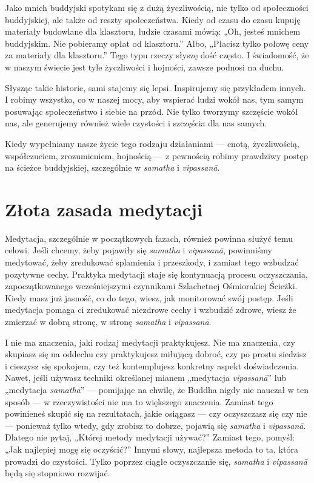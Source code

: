 \documentclass[12pt,openany]{book}
\begin{document}
Jako mnich buddyjski spotykam się z dużą życzliwością, nie tylko od społeczności buddyjskiej, ale także od reszty społeczeństwa. Kiedy od czasu do czasu kupuję materiały budowlane dla klasztoru, ludzie czasami mówią: „Oh, jesteś mnichem buddyjskim. Nie pobieramy opłat od klasztoru.” Albo, „Płacisz tylko połowę ceny za materiały dla klasztoru.” Tego typu rzeczy słyszę dość często. I świadomość, że w naszym świecie jest tyle życzliwości i hojności, zawsze podnosi na duchu. 

Słysząc takie historie, sami stajemy się lepsi. Inspirujemy się przykładem innych. I robimy wszystko, co w naszej mocy, aby wspierać ludzi wokół nas, tym samym posuwając społeczeństwo i siebie na przód. Nie tylko tworzymy szczęście wokół nas, ale generujemy również wiele czystości i szczęścia dla nas samych.

Kiedy wypełniamy nasze życie tego rodzaju działaniami \linebreak --- cnotą, życzliwością, współczuciem, zrozumieniem, hojnością --- z pewnością robimy prawdziwy postęp na ścieżce buddyjskiej, szczególnie w \textit{samatha} i \textit{vipassanā}.

\section*{Złota zasada medytacji}

Medytacja, szczególnie w początkowych fazach, również po\-win\-na służyć temu celowi. Jeśli chcemy, żeby pojawiły się \textit{samatha} i \textit{vipassanā}, powinniśmy medytować, żeby zredukować splamienia i przeszkody, i zamiast tego wzbudzać pozytywne cechy. Praktyka medytacji staje się kontynuacją procesu oczyszczania, zapoczątkowanego wcześniejszymi czynnikami Szlachetnej Ośmiorakiej Ścieżki. Kiedy masz już jasność, co do tego, wiesz, jak monitorować swój postęp. Jeśli medytacja pomaga ci zredukować niezdrowe cechy i wzbudzić zdrowe, wiesz że zmierzać w dobrą stro\-nę, w stronę \textit{samatha} i \textit{vipassanā}.

I nie ma znaczenia, jaki rodzaj medytacji praktykujesz. Nie ma znaczenia, czy skupiasz się na oddechu czy praktykujesz miłującą dobroć, czy po prostu siedzisz i cieszysz się spokojem, czy też kontemplujesz konkretny aspekt doświadczenia. Nawet, jeśli używasz techniki określanej mianem „medytacja \textit{vipassanā}” lub „medytacja \textit{samatha}” --- pomijając na chwilę, że Buddha nigdy nie nauczał w ten sposób --- w rzeczywistości nie ma to większego znaczenia. Zamiast tego powinieneś skupić się na rezultatach, jakie osiągasz --- czy oczyszczasz się czy nie --- ponieważ tylko wte\-dy, gdy zrobisz to dobrze, pojawią się \textit{samatha} i \textit{vipassanā}. Dlatego nie pytaj, „Której metody medytacji używać?” Zamiast tego, pomyśl: „Jak najlepiej mogę się oczyścić?” Innymi słowy, najlepsza metoda to ta, która prowadzi do czystości. Tylko poprzez ciągłe oczyszczanie się, \textit{samatha} i \textit{vipassanā} będą się stopniowo rozwijać.
\end{document}
